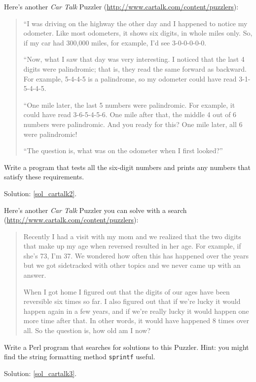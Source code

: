 \begin{exercise}
Here's another {\em Car Talk}
Puzzler (\url{http://www.cartalk.com/content/puzzlers}):
\label{cartalk2}

\begin{quote}
``I was driving on the highway the other day and I happened to
notice my odometer. Like most odometers, it shows six digits,
in whole miles only. So, if my car had 300,000
miles, for example, I'd see 3-0-0-0-0-0.

``Now, what I saw that day was very interesting. I noticed that the
last 4 digits were palindromic; that is, they read the same forward as
backward. For example, 5-4-4-5 is a palindrome, so my odometer
could have read 3-1-5-4-4-5.

``One mile later, the last 5 numbers were palindromic. For example, it
could have read 3-6-5-4-5-6.  One mile after that, the middle 4 out of
6 numbers were palindromic.  And you ready for this? One mile later,
all 6 were palindromic!

``The question is, what was on the odometer when I first looked?''
\end{quote}

Write a program that tests all the six-digit numbers and prints
any numbers that satisfy these requirements.
  
Solution: \ref{sol_cartalk2}.

\end{exercise}


\begin{exercise}
Here's another {\em Car Talk} Puzzler you can solve with a
search (\url{http://www.cartalk.com/content/puzzlers}):
\label{cartalk3}

\begin{quote}
Recently I had a visit with my mom and we realized that
the two digits that make up my age when reversed resulted in her
age. For example, if she's 73, I'm 37. We wondered how often this has
happened over the years but we got sidetracked with other topics and
we never came up with an answer.

When I got home I figured out that the digits of our ages have been
reversible six times so far. I also figured out that if we're lucky it
would happen again in a few years, and if we're really lucky it would
happen one more time after that. In other words, it would have
happened 8 times over all. So the question is, how old am I now?

\end{quote}

Write a Perl program that searches for solutions to this Puzzler.
Hint: you might find the string formatting method 
{\tt sprintf} useful.

Solution: \ref{sol_cartalk3}.

\end{exercise}

